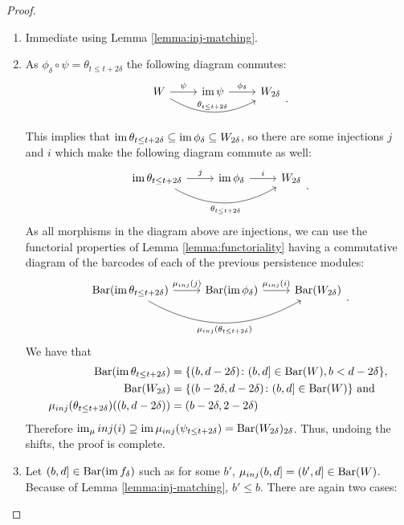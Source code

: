 \begin{proof}
\begin{enumerate}
    \item Immediate using Lemma \ref{lemma:inj-matching}.
    \item As $ \phi_\delta \circ \psi = \theta_{t \leq t+2\delta} $ the following diagram conmutes:
    $$
    \begin{tikzcd}
        W \arrow[r, "\psi"] \arrow[rr, "\theta_{t \leq t+2\delta}", bend right] 
        & \im \psi \arrow[r, "\phi_\delta"] 
        & W_{2\delta} \\
    \end{tikzcd}.
    $$
    This implies that $ \operatorname{im} \theta_{t \leq t+2\delta} \subseteq \operatorname{im} \phi_\delta \subseteq W_{2\delta} $, so there are some injections $ j $ and $ i $ which make the following diagram commute as well:
    $$
    \begin{tikzcd}
        \im \theta_{t \leq t+2\delta} \arrow[r, "j"] \arrow[rr, "\theta_{t \leq t+2\delta}"', bend right] 
        & \im \phi_\delta \arrow[r, "i"] 
        & W_{2\delta} \\
    \end{tikzcd}.
    $$
    As all morphisms in the diagram above are injections, we can use the functorial properties of Lemma \ref{lemma:functoriality} having a commutative diagram of the barcodes of each of the previous persistence modules:
    $$
    \begin{tikzcd}
        \barc(\im \theta_{t \leq t+2\delta}) \arrow[r, "\mu_{inj}(j)"] \arrow[rr, "\mu_{inj}(\theta_{t \leq t+2\delta})"', bend right] 
        & \barc(\im \phi_\delta) \arrow[r, "\mu_{inj}(i)"] 
        & \barc(W_{2\delta}) \\
    \end{tikzcd}.
    $$
    We have that
    \begin{align}
        \operatorname{Bar}(\operatorname{im} \theta_{t \leq t+2\delta}) &= \{ (b, d-2 \delta) \colon (b, d] \in \operatorname{Bar}(W), b < d - 2 \delta\}, \\
        \operatorname{Bar}(W_{2 \delta}) &= \{ (b - 2 \delta, d - 2\delta) \colon (b, d] \in \operatorname{Bar}(W) \} \text{ and } \\
        \mu_{inj}(\theta_{t \leq t+2\delta})((b, d-2 \delta)) &= (b - 2 \delta, 2 - 2\delta)
    \end{align}
    Therefore $ \operatorname{im}_\mu{inj}(i) \supseteq \operatorname{im} \mu_{inj}(\psi_{t \leq t+2\delta}) = \operatorname{Bar}(W_{2 \delta})_{2 \delta}$. Thus, undoing the shifts, the proof is complete.

    \item Let $ (b, d] \in \operatorname{Bar}(\operatorname{im} f_\delta) $ such as for some $ b' $, $ \mu_{inj}(b, d] = (b', d] \in \operatorname{Bar}(W) $. Because of Lemma \ref{lemma:inj-matching}, $ b' \leq b $. There are again two cases:
    

\end{enumerate}
\end{proof}
